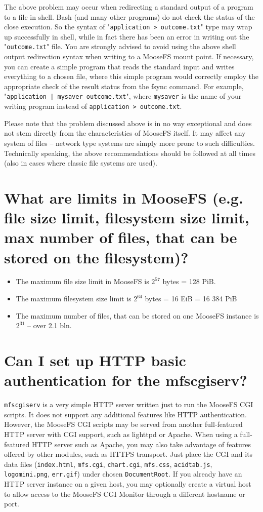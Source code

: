 \documentclass[a4paper,11pt,english]{report}
\def\code#1{\texttt{#1}}
\begin{document}
		The above problem may occur when redirecting a standard output of a program to a file in shell. Bash (and many other programs) do not check the status of the close execution. So the syntax of "\code{application > outcome.txt}" type may wrap up successfully in shell, while in fact there has been an error in writing out the "\code{outcome.txt}" file. You are strongly advised to avoid using the above shell output redirection syntax when writing to a MooseFS mount point. If necessary, you can create a simple program that reads the standard input and writes everything to a chosen file, where this simple program would correctly employ the appropriate check of the result status from the fsync command. For example,  "\code{application | mysaver outcome.txt}", where \code{mysaver} is the name of your writing program instead of \code{application > outcome.txt}.
		
		Please note that the problem discussed above is in no way exceptional and does not stem directly from the characteristics of MooseFS itself. It may affect any system of files -- network type systems are simply more prone to such difficulties. Technically speaking, the above recommendations should be followed at all times (also in cases where classic file systems are used).


		\section{What are limits in MooseFS (e.g. file size limit, filesystem size limit, max number of files, that can be stored on the filesystem)?}
		
		\begin{itemize}
			\item The maximum file size limit in MooseFS is $2^{57}$ bytes = 128 PiB.
			\item The maximum filesystem size limit is $2^{64}$ bytes = 16 EiB = 16 384 PiB
			\item The maximum number of files, that can be stored on one MooseFS instance is $2^{31}$ -- over 2.1 bln.
		\end{itemize}
				 
		\section{Can I set up HTTP basic authentication for the mfscgiserv?}
		\code{mfscgiserv} is a very simple HTTP server written just to run the MooseFS CGI scripts. It does not support any additional features like HTTP authentication. However, the MooseFS CGI scripts may be served from another full-featured HTTP server with CGI support, such as lighttpd or Apache. When using a full-featured HTTP server such as Apache, you may also take advantage of features offered by other modules, such as HTTPS transport. Just place the CGI and its data files (\code{index.html}, \code{mfs.cgi}, \code{chart.cgi}, \code{mfs.css}, \code{acidtab.js}, \code{logomini.png}, \code{err.gif}) under chosen \code{DocumentRoot}. If you already have an HTTP server instance on a given host, you may optionally create a virtual host to allow access to the MooseFS CGI Monitor through a different hostname or port.  
		
\end{document}
